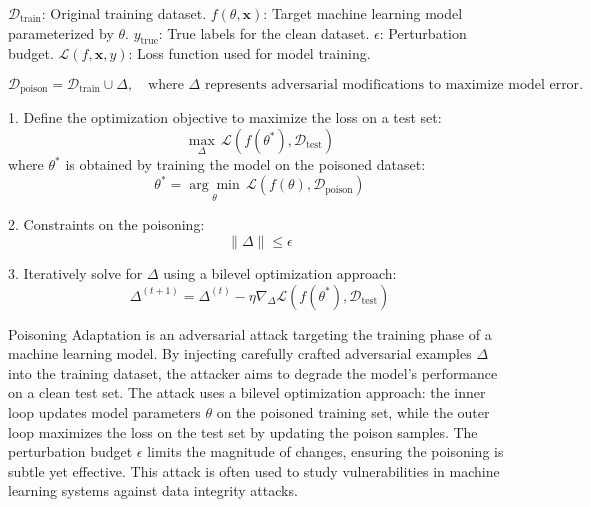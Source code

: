  $\mathcal{D}_{\text{train}}$: Original training dataset.  
$f(\theta, \mathbf{x})$: Target machine learning model parameterized by $\theta$.  
$y_{\text{true}}$: True labels for the clean dataset.  
$\epsilon$: Perturbation budget.  
$\mathcal{L}(f, \mathbf{x}, y)$: Loss function used for model training.  

\[
\mathcal{D}_{\text{poison}} = \mathcal{D}_{\text{train}} \cup \Delta, \quad \text{where } \Delta \text{ represents adversarial modifications to maximize model error}.
\]

1. Define the optimization objective to maximize the loss on a test set:  
\[
\max_{\Delta} \, \mathcal{L}(f(\theta^*), \mathcal{D}_{\text{test}})
\]
where $\theta^*$ is obtained by training the model on the poisoned dataset:
\[
\theta^* = \underset{\theta}{\arg \min} \, \mathcal{L}(f(\theta), \mathcal{D}_{\text{poison}})
\]

2. Constraints on the poisoning:
\[
\|\Delta\| \leq \epsilon
\]

3. Iteratively solve for $\Delta$ using a bilevel optimization approach:
\[
\Delta^{(t+1)} = \Delta^{(t)} - \eta \nabla_\Delta \mathcal{L}(f(\theta^*), \mathcal{D}_{\text{test}})
\]

Poisoning Adaptation is an adversarial attack targeting the training phase of a machine learning model. By injecting carefully crafted adversarial examples $\Delta$ into the training dataset, the attacker aims to degrade the model's performance on a clean test set. The attack uses a bilevel optimization approach: the inner loop updates model parameters $\theta$ on the poisoned training set, while the outer loop maximizes the loss on the test set by updating the poison samples. The perturbation budget $\epsilon$ limits the magnitude of changes, ensuring the poisoning is subtle yet effective. This attack is often used to study vulnerabilities in machine learning systems against data integrity attacks.

